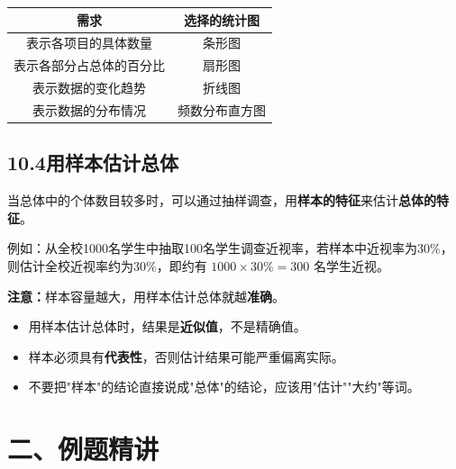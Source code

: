 \documentclass[12pt, a4paper]{ctexart}
\begin{document}
\begin{tipbox}[统计图的选择]
\renewcommand{\arraystretch}{1.3}
\begin{center}
\begin{tabular}{|c|c|}
\hline
\textbf{需求} & \textbf{选择的统计图} \\
\hline
表示各项目的具体数量 & 条形图 \\
\hline
表示各部分占总体的百分比 & 扇形图 \\
\hline
表示数据的变化趋势 & 折线图 \\
\hline
表示数据的分布情况 & 频数分布直方图 \\
\hline
\end{tabular}
\end{center}
\end{tipbox}

\subsection*{10.4\quad 用样本估计总体}

\begin{knowledgebox}[10.4.1 用样本估计总体]
当总体中的个体数目较多时，可以通过抽样调查，用\textbf{样本的特征}来估计\textbf{总体的特征}。

例如：从全校1000名学生中抽取100名学生调查近视率，若样本中近视率为$30\%$，则估计全校近视率约为$30\%$，即约有 $1000 \times 30\% = 300$ 名学生近视。

\textbf{注意：}样本容量越大，用样本估计总体就越\textbf{准确}。
\end{knowledgebox}

\begin{warnbox}[易错提醒]
\begin{itemize}[leftmargin=2em]
  \item 用样本估计总体时，结果是\textbf{近似值}，不是精确值。
  \item 样本必须具有\textbf{代表性}，否则估计结果可能严重偏离实际。
  \item 不要把"样本"的结论直接说成"总体"的结论，应该用"估计""大约"等词。
\end{itemize}
\end{warnbox}

\section*{\textcolor{examorange}{二、例题精讲}}
\end{document}
